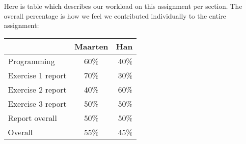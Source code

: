 \addtocounter{exerciseCount}{1} \noindent {} \par
Here is table which describes our workload on this assignment per section.
The overall percentage is how we feel we contributed individually to the entire assignment:

\begin{center}
	\begin{tabular}{ l | c | r }
	    & Maarten & Han \\ \hline
	  Programming & 60\% & 40\% \\
	  \hline
	  Exercise 1 report & 70\% & 30\% \\
	  Exercise 2 report & 40\% & 60\% \\
	  Exercise 3 report & 50\% & 50\% \\
	  \hline
	  Report overall & 50\% & 50\% \\ \hline \hline
	  Overall & 55\% & 45\%
	\end{tabular}
\end{center}